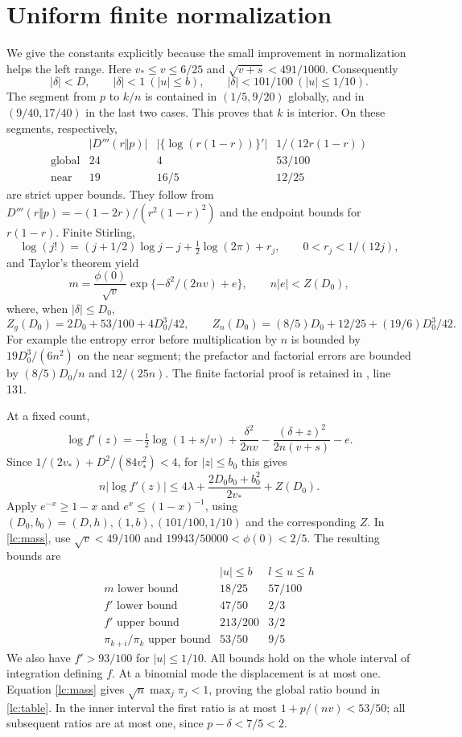 \documentclass[11pt]{article}
\begin{document}
\section{Uniform finite normalization}
We give the constants explicitly because the small improvement in
normalization helps the left range. Here $v_*\le v\le6/25$ and
$\sqrt{v+s}<491/1000$. Consequently
\[
 |\delta|<D,\qquad |\delta|<1\ (|u|\le b),\qquad
 |\delta|<101/100\ (|u|\le1/10).
\]
The segment from $p$ to $k/n$ is contained in $(1/5,9/20)$ globally,
and in $(9/40,17/40)$ in the last two cases. This proves that $k$ is
interior. On these segments, respectively,
\[
\begin{array}{c|ccc}
 &|D'''(r\Vert p)|&|\{\log(r(1-r))\}'|&1/(12r(1-r))\\\hline
\text{global}&24&4&53/100\\
\text{near}&19&16/5&12/25
\end{array}
\]
are strict upper bounds. They follow from
$D'''(r\Vert p)=-(1-2r)/(r^2(1-r)^2)$ and the endpoint bounds for
$r(1-r)$. Finite Stirling,
\[
 \log(j!)=(j+1/2)\log j-j+\tfrac12\log(2\pi)+r_j,
 \qquad 0<r_j<1/(12j),
\]
and Taylor's theorem yield
\begin{equation}\label{lc:mass}
 m=\frac{\phi(0)}{\sqrt v}
      \exp\{-\delta^2/(2nv)+e\},\qquad n|e|<Z(D_0),
\end{equation}
where, when $|\delta|\le D_0$,
\[
 Z_g(D_0)=2D_0+53/100+4D_0^3/42,\qquad
 Z_n(D_0)=(8/5)D_0+12/25+(19/6)D_0^3/42.
\]
For example the entropy error before multiplication by $n$ is bounded
by $19D_0^3/(6n^2)$ on the near segment; the prefactor and factorial
errors are bounded by $(8/5)D_0/n$ and $12/(25n)$.
The finite factorial proof is retained in
, line 131.

At a fixed count,
\[
 \log f'(z)=-\tfrac12\log(1+s/v)+\frac{\delta^2}{2nv}
                -\frac{(\delta+z)^2}{2n(v+s)}-e.
\]
Since $1/(2v_*)+D^2/(84v_*^2)<4$, for $|z|\le b_0$ this gives
\[
 n|\log f'(z)|\le4\lambda+
             \frac{2D_0b_0+b_0^2}{2v_*}+Z(D_0).
\]
Apply $e^{-x}\ge1-x$ and $e^x\le(1-x)^{-1}$, using
$(D_0,b_0)=(D,h),(1,b),(101/100,1/10)$ and the corresponding $Z$.
In \eqref{lc:mass}, use $\sqrt v<49/100$ and
$19943/50000<\phi(0)<2/5$. The resulting bounds are
\begin{equation}\label{lc:table}
\begin{array}{c|cc}
 &|u|\le b&l\le u\le h\\\hline
 m\text{ lower bound}&18/25&57/100\\
 f'\text{ lower bound}&47/50&2/3\\
 f'\text{ upper bound}&213/200&3/2\\
 \pi_{k+i}/\pi_k\text{ upper bound}&53/50&9/5
\end{array}
\end{equation}
We also have $f'>93/100$ for $|u|\le1/10$. All bounds hold on
the whole interval of integration defining $f$.
At a binomial mode the displacement is at most one. Equation
\eqref{lc:mass} gives $\sqrt n\max_j\pi_j<1$, proving the global
ratio bound in \eqref{lc:table}. In the inner interval the first ratio
is at most $1+p/(nv)<53/50$; all subsequent ratios are at most one,
since $p-\delta<7/5<2$.
\end{document}
